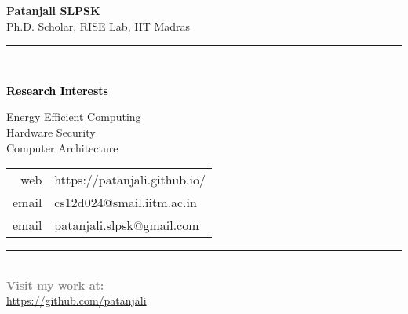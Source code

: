 \documentclass[11pt,a4paper]{memoir}
\begin{document}
    \begin{Spacing}{0.75}%
    \noindent
    \textcolor{bleudefrance}{\textbf{Patanjali SLPSK}}\\
    \tiny Ph.D. Scholar, RISE Lab, IIT Madras \\ %
    \rule{74mm}{.3mm}\\
    \begin{minipage}[t]{33mm}
        \vspace{-0mm}%
      \textcolor{black}{\normalsize{\textbf{Research Interests}}}\\
      {\scriptsize
  \begin{Spacing}{1}%
            
                 Energy Efficient Computing\\
                 Hardware Security\\
                 Computer Architecture \\
            

            
            \end{Spacing}
        }
    \end{minipage}
    \hspace{1mm}
    \begin{minipage}[t]{42mm}
        \vspace{-0mm}%
        \begin{flushleft}
       
        {\tiny
        	\begin{tabular}{rl}
            	{\color{gray}web} & https://patanjali.github.io/\\
            	{\color{gray}email} & cs12d024@smail.iitm.ac.in\\
            	{\color{gray}email} & patanjali.slpsk@gmail.com\\
            	
            \end{tabular}
            \vspace*{2mm}
        }
        \end{flushleft}
    \end{minipage}
    \rule{74mm}{0mm}\\
    \textcolor{gray}{\textbf{Visit my work at:}}\\
    \url{https://github.com/patanjali} %
    \end{Spacing}
\end{document}
